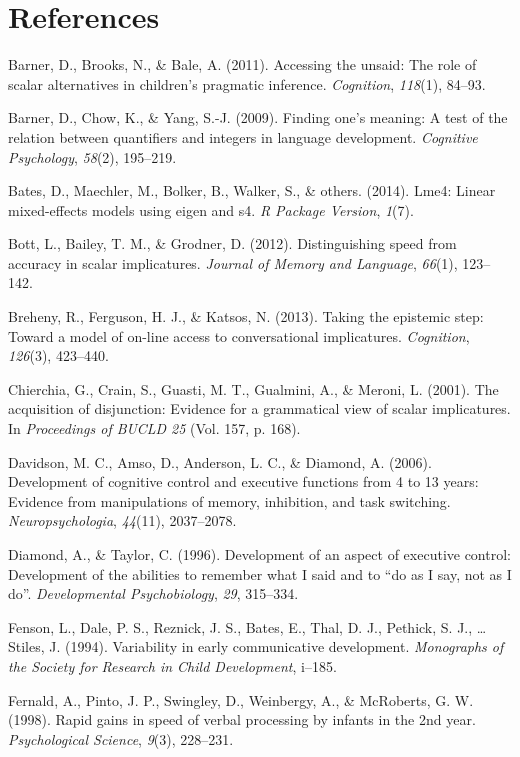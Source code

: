 \documentclass[a4paper,man,apacite,floatsintext]{apa6}
\begin{document}
\newpage

\section*{References}\label{references}

Barner, D., Brooks, N., \& Bale, A. (2011). Accessing the unsaid: The
role of scalar alternatives in children's pragmatic inference.
\emph{Cognition}, \emph{118}(1), 84--93.

Barner, D., Chow, K., \& Yang, S.-J. (2009). Finding one's meaning: A
test of the relation between quantifiers and integers in language
development. \emph{Cognitive Psychology}, \emph{58}(2), 195--219.

Bates, D., Maechler, M., Bolker, B., Walker, S., \& others. (2014).
Lme4: Linear mixed-effects models using eigen and s4. \emph{R Package
Version}, \emph{1}(7).

Bott, L., Bailey, T. M., \& Grodner, D. (2012). Distinguishing speed
from accuracy in scalar implicatures. \emph{Journal of Memory and
Language}, \emph{66}(1), 123--142.

Breheny, R., Ferguson, H. J., \& Katsos, N. (2013). Taking the epistemic
step: Toward a model of on-line access to conversational implicatures.
\emph{Cognition}, \emph{126}(3), 423--440.

Chierchia, G., Crain, S., Guasti, M. T., Gualmini, A., \& Meroni, L.
(2001). The acquisition of disjunction: Evidence for a grammatical view
of scalar implicatures. In \emph{Proceedings of BUCLD 25} (Vol. 157, p.
168).

Davidson, M. C., Amso, D., Anderson, L. C., \& Diamond, A. (2006).
Development of cognitive control and executive functions from 4 to 13
years: Evidence from manipulations of memory, inhibition, and task
switching. \emph{Neuropsychologia}, \emph{44}(11), 2037--2078.

Diamond, A., \& Taylor, C. (1996). Development of an aspect of executive
control: Development of the abilities to remember what I said and to
``do as I say, not as I do''. \emph{Developmental Psychobiology},
\emph{29}, 315--334.

Fenson, L., Dale, P. S., Reznick, J. S., Bates, E., Thal, D. J.,
Pethick, S. J., \ldots{} Stiles, J. (1994). Variability in early
communicative development. \emph{Monographs of the Society for Research
in Child Development}, i--185.

Fernald, A., Pinto, J. P., Swingley, D., Weinbergy, A., \& McRoberts, G.
W. (1998). Rapid gains in speed of verbal processing by infants in the
2nd year. \emph{Psychological Science}, \emph{9}(3), 228--231.
\end{document}
